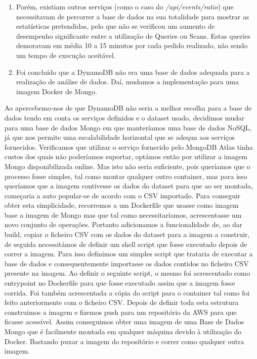 \documentclass[11pt,a4paper]{article}
\begin{document}
\begin{enumerate}
	\item Porém, existiam outros serviços (como o caso do \textit{/api/events/ratio}) que necessitavam de percorrer a base de dados na sua totalidade para mostrar as estatísticas pretendidas, pelo que não se verificou um aumento de desempenho significante entre a utilização de Queries ou Scans. Estas queries demoravam em média 10 a 15 minutos por cada pedido realizado, não sendo um tempo de execução aceitável.
	
	\item Foi concluído que a DynamoDB não era uma base de dados adequada para a realização de análise de dados. Daí, mudamos a implementação para uma imagem Docker de Mongo.
\end{enumerate}

Ao apercebemo-nos de que DynamoDB não seria a melhor escolha para a base de dados tendo em conta os serviços definidos e o dataset usado, decidimos mudar para uma base de dados Mongo em que manteríamos uma base de dados NoSQL, já que nos permite uma escalabilidade horizontal que se adequa aos serviços fornecidos.
Verificamos que utilizar o serviço fornecido pelo MongoDB Atlas tinha custos dos quais não poderíamos suportar, optámos então por utilizar a imagem Mongo disponibilizada online. Mas isto não seria suficiente, pois queríamos que o processo fosse simples, tal como montar qualquer outro container, mas para isso queríamos que a imagem contivesse os dados do dataset para que ao ser montada, começaria a auto popular-se de acordo com o CSV importado. Para conseguir obter esta simplicidade, recorremos a um Dockerfile que usasse como imagem base a imagem de Mongo mas que tal como necessitaríamos, acrescentasse um novo conjunto de operações. Portanto adicionamos a funcionalidade de, ao dar build, copiar o ficheiro CSV com os dados do dataset para a imagem a construir, de seguida necessitámos de definir um shell script que fosse executado depois de correr a imagem. Para isso definimos um simples script que trataria de executar a base de dados e consequentemente importasse os dados contidos no ficheiro CSV presente na imagem. Ao definir o seguinte script, o mesmo foi acrescentado como entrypoint no Dockerfile para que fosse executado assim que a imagem fosse corrida. Foi também acrescentada a cópia do script para o container tal como foi feito anteriormente com o ficheiro CSV.
Depois de definir toda esta estrutura construimos a imagem e fizemos push para um repositório da AWS para que ficasse acessível. Assim conseguimos obter uma imagem de uma Base de Dados Mongo que é facilmente montada em qualquer máquina devido à utilização do Docker. Bastando puxar a imagem do repositório e correr como qualquer outra imagem.
\end{document}
